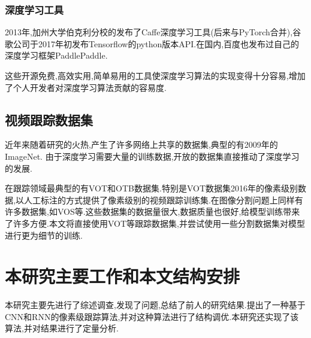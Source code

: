 \subsubsection{深度学习工具}
2013年,加州大学伯克利分校的发布了Caffe\supercite{jia2014caffe}深度学习工具(后来与PyTorch\supercite{paszke2017automatic}合并),谷歌公司于2017年初发布Tensorflow\supercite{abadi2016tensorflow}的python版本API.在国内,百度也发布过自己的深度学习框架PaddlePaddle\supercite{recognize_digits_paddle}.
\par
这些开源免费,高效实用,简单易用的工具使深度学习算法的实现变得十分容易,增加了个人开发者对深度学习算法贡献的容易度.

\subsection{视频跟踪数据集}
近年来随着研究的火热,产生了许多网络上共享的数据集,典型的有2009年的ImageNet\supercite{imagenet_cvpr09}.
由于深度学习需要大量的训练数据,开放的数据集直接推动了深度学习的发展.
\par
在跟踪领域最典型的有VOT\supercite{VOT_TPAMI}和OTB\supercite{WuLimYang13}数据集.特别是VOT数据集2016年的像素级别数据\supercite{Vojir-TR-2017-01},以人工标注的方式提供了像素级别的视频跟踪训练集.在图像分割问题上同样有许多数据集,如VOS\supercite{Cae+17}等.这些数据集的数据量很大,数据质量也很好,给模型训练带来了许多方便.本文将直接使用VOT等跟踪数据集,并尝试使用一些分割数据集对模型进行更为细节的训练.

\newpage
\section{本研究主要工作和本文结构安排}
本研究主要先进行了综述调查,发现了问题,总结了前人的研究结果.提出了一种基于CNN和RNN的像素级跟踪算法,并对这种算法进行了结构调优.本研究还实现了该算法,并对结果进行了定量分析.

